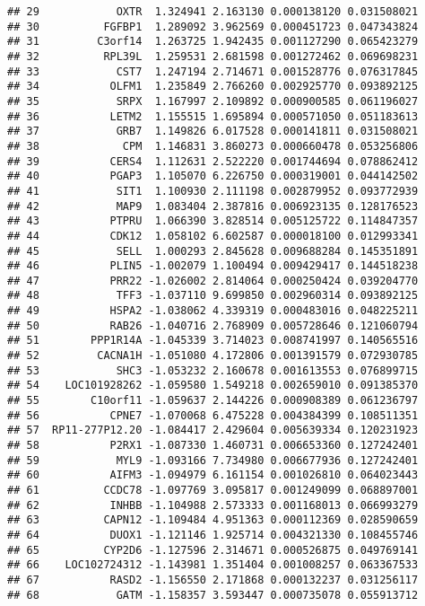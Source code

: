 \documentclass[
]{article}
\begin{document}
\begin{verbatim}
## 29            OXTR  1.324941 2.163130 0.000138120 0.031508021
## 30          FGFBP1  1.289092 3.962569 0.000451723 0.047343824
## 31         C3orf14  1.263725 1.942435 0.001127290 0.065423279
## 32          RPL39L  1.259531 2.681598 0.001272462 0.069698231
## 33            CST7  1.247194 2.714671 0.001528776 0.076317845
## 34           OLFM1  1.235849 2.766260 0.002925770 0.093892125
## 35            SRPX  1.167997 2.109892 0.000900585 0.061196027
## 36           LETM2  1.155515 1.695894 0.000571050 0.051183613
## 37            GRB7  1.149826 6.017528 0.000141811 0.031508021
## 38             CPM  1.146831 3.860273 0.000660478 0.053256806
## 39           CERS4  1.112631 2.522220 0.001744694 0.078862412
## 40           PGAP3  1.105070 6.226750 0.000319001 0.044142502
## 41            SIT1  1.100930 2.111198 0.002879952 0.093772939
## 42            MAP9  1.083404 2.387816 0.006923135 0.128176523
## 43           PTPRU  1.066390 3.828514 0.005125722 0.114847357
## 44           CDK12  1.058102 6.602587 0.000018100 0.012993341
## 45            SELL  1.000293 2.845628 0.009688284 0.145351891
## 46           PLIN5 -1.002079 1.100494 0.009429417 0.144518238
## 47           PRR22 -1.026002 2.814064 0.000250424 0.039204770
## 48            TFF3 -1.037110 9.699850 0.002960314 0.093892125
## 49           HSPA2 -1.038062 4.339319 0.000483016 0.048225211
## 50           RAB26 -1.040716 2.768909 0.005728646 0.121060794
## 51        PPP1R14A -1.045339 3.714023 0.008741997 0.140565516
## 52         CACNA1H -1.051080 4.172806 0.001391579 0.072930785
## 53            SHC3 -1.053232 2.160678 0.001613553 0.076899715
## 54    LOC101928262 -1.059580 1.549218 0.002659010 0.091385370
## 55        C10orf11 -1.059637 2.144226 0.000908389 0.061236797
## 56           CPNE7 -1.070068 6.475228 0.004384399 0.108511351
## 57  RP11-277P12.20 -1.084417 2.429604 0.005639334 0.120231923
## 58           P2RX1 -1.087330 1.460731 0.006653360 0.127242401
## 59            MYL9 -1.093166 7.734980 0.006677936 0.127242401
## 60           AIFM3 -1.094979 6.161154 0.001026810 0.064023443
## 61          CCDC78 -1.097769 3.095817 0.001249099 0.068897001
## 62           INHBB -1.104988 2.573333 0.001168013 0.066993279
## 63          CAPN12 -1.109484 4.951363 0.000112369 0.028590659
## 64           DUOX1 -1.121146 1.925714 0.004321330 0.108455746
## 65          CYP2D6 -1.127596 2.314671 0.000526875 0.049769141
## 66    LOC102724312 -1.143981 1.351404 0.001008257 0.063367533
## 67           RASD2 -1.156550 2.171868 0.000132237 0.031256117
## 68            GATM -1.158357 3.593447 0.000735078 0.055913712

\end{verbatim}
\end{document}
